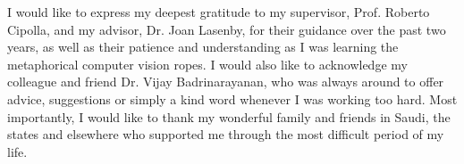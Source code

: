 
\begin{acknowledgements}      


I would like to express my deepest gratitude to my supervisor, Prof. Roberto Cipolla, and my advisor, Dr. Joan Lasenby, for their guidance over the past two years, as well as their patience and understanding as I was learning the metaphorical computer vision ropes.
I would also like to acknowledge my colleague and friend Dr. Vijay Badrinarayanan, who was always around to offer advice, suggestions or simply a kind word whenever I was working too hard.
Most importantly, I would like to thank my wonderful family and friends in Saudi, the states and elsewhere who supported me through the most difficult period of my life.



\end{acknowledgements}
